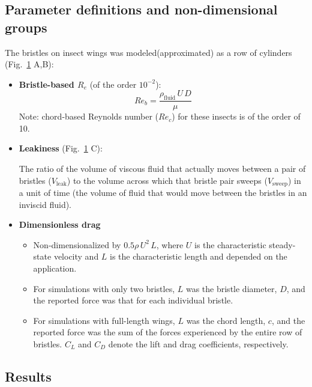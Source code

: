 \documentclass[preprint, letterpaper, nobibnotes, aps, superscriptaddress,prb]{revtex4-1}
\begin{document}
\subsection{Parameter definitions and non-dimensional groups}
The bristles on insect wings was modeled(approximated) as a row of cylinders (Fig.~\ref{fig1} A,B):

\begin{figure}[H]
  \centering {}
  \caption{}\label{fig1}
\end{figure}

\begin{itemize}
\item 
\textbf{Bristle-based $R_e$} (of the order $10^{-2}$):
\begin{equation*}
Re_b = \frac{\rho_{\mathrm{fluid}}\,U\,D}{\mu}
\end{equation*}
Note: chord-based Reynolds number ($Re_c$) for these insects is of the order of 10.
\item 
\textbf{Leakiness} (Fig.~\ref{fig1} C):

The ratio of the volume of viscous fluid that actually moves between a pair of bristles ($V_\mathrm{leak}$) to the volume across which that bristle pair sweeps ($V_{\mathrm{sweep}}$) in a unit of time (the volume of fluid that would move between the bristles in an inviscid fluid).


\item
\textbf{Dimensionless drag}
\begin{itemize}
	\item
Non-dimensionalized by $0.5\rho\,U^2\,L$, where $U$ is the characteristic steady-state velocity and $L$ is the characteristic length and depended on the application. 
	\item
For simulations with only two bristles, $L$ was the bristle diameter, $D$, and the reported force was that for each individual bristle. 
	\item
For simulations with full-length wings, $L$ was the chord length, $c$, and the reported force was the sum of the forces experienced by the entire row of bristles. $C_L$ and $C_D$ denote the lift and drag coefficients, respectively.
\end{itemize}
\end{itemize}

\subsection{Results}
\end{document}
